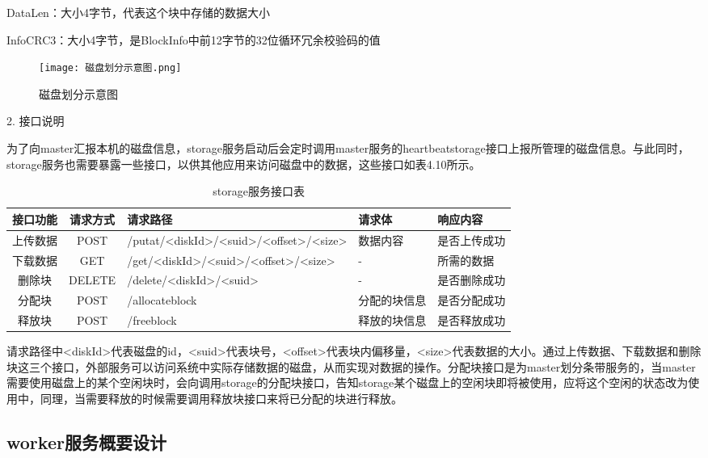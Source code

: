 DataLen：大小4字节，代表这个块中存储的数据大小

InfoCRC3：大小4字节，是BlockInfo中前12字节的32位循环冗余校验码的值

\begin{figure}
  \centering
  \texttt{[image: 磁盘划分示意图.png]}
  \caption{磁盘划分示意图}
\end{figure}

2. 接口说明

为了向master汇报本机的磁盘信息，storage服务启动后会定时调用master服务的heartbeatstorage接口上报所管理的磁盘信息。与此同时，storage服务也需要暴露一些接口，以供其他应用来访问磁盘中的数据，这些接口如表4.10所示。

\begin{table}[h]
    \centering
    \caption{storage服务接口表}
    \begin{tabular}{ccp{4cm}p{2cm}p{3cm}}
      \toprule
      接口功能   & 请求方式    & 请求路径     & 请求体    & 响应内容                     \\
      \midrule
      上传数据      & POST   & /putat/<diskId>/<suid>\newline/<offset>/<size> & 数据内容      & 是否上传成功\\
      下载数据      & GET    & /get/<diskId>\newline/<suid>/<offset>/<size>   & -            & 所需的数据\\
      删除块        & DELETE & /delete/<diskId>/<suid>                        & -            & 是否删除成功\\
      分配块        & POST   & /allocateblock                                 & 分配的块信息  & 是否分配成功\\
      释放块        & POST   & /freeblock                                     & 释放的块信息  & 是否释放成功\\
      \bottomrule
    \end{tabular}
\end{table}	

请求路径中<diskId>代表磁盘的id，<suid>代表块号，<offset>代表块内偏移量，<size>代表数据的大小。通过上传数据、下载数据和删除块这三个接口，外部服务可以访问系统中实际存储数据的磁盘，从而实现对数据的操作。分配块接口是为master划分条带服务的，当master需要使用磁盘上的某个空闲块时，会向调用storage的分配块接口，告知storage某个磁盘上的空闲块即将被使用，应将这个空闲的状态改为使用中，同理，当需要释放的时候需要调用释放块接口来将已分配的块进行释放。

\subsection{worker服务概要设计}

